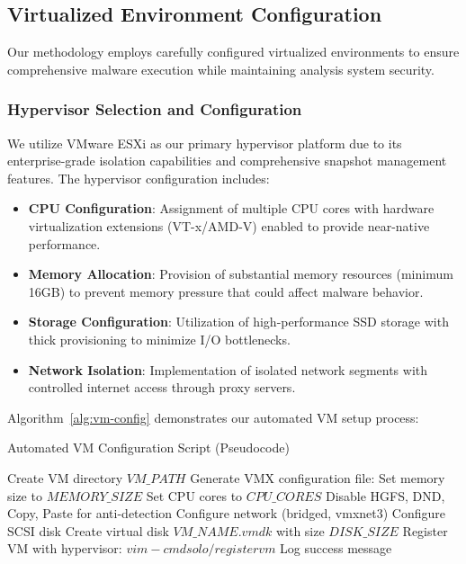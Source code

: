 \subsection{Virtualized Environment Configuration}
\label{subsec:environment-config}

Our methodology employs carefully configured virtualized environments to ensure comprehensive malware execution while maintaining analysis system security.

\subsubsection{Hypervisor Selection and Configuration}

We utilize VMware ESXi as our primary hypervisor platform due to its enterprise-grade isolation capabilities and comprehensive snapshot management features. The hypervisor configuration includes:

\begin{itemize}
    \item \textbf{CPU Configuration}: Assignment of multiple CPU cores with hardware virtualization extensions (VT-x/AMD-V) enabled to provide near-native performance.
    
    \item \textbf{Memory Allocation}: Provision of substantial memory resources (minimum 16GB) to prevent memory pressure that could affect malware behavior.
    
    \item \textbf{Storage Configuration}: Utilization of high-performance SSD storage with thick provisioning to minimize I/O bottlenecks.
    
    \item \textbf{Network Isolation}: Implementation of isolated network segments with controlled internet access through proxy servers.
\end{itemize}

Algorithm~\ref{alg:vm-config} demonstrates our automated VM setup process:

\begin{algorithm}[!htbp]
\caption{Automated VM Configuration Script (Pseudocode)}
\label{alg:vm-config}
\begin{algorithmic}[1]
    \State Create VM directory $VM\_PATH$
    \State Generate VMX configuration file:
    \State \quad Set memory size to $MEMORY\_SIZE$
    \State \quad Set CPU cores to $CPU\_CORES$
    \State \quad Disable HGFS, DND, Copy, Paste for anti-detection
    \State \quad Configure network (bridged, vmxnet3)
    \State \quad Configure SCSI disk
    \State Create virtual disk $VM\_NAME.vmdk$ with size $DISK\_SIZE$
    \State Register VM with hypervisor: $vim-cmd solo/registervm$
    \State Log success message
\EndProcedure
\end{algorithmic}
\end{algorithm}

